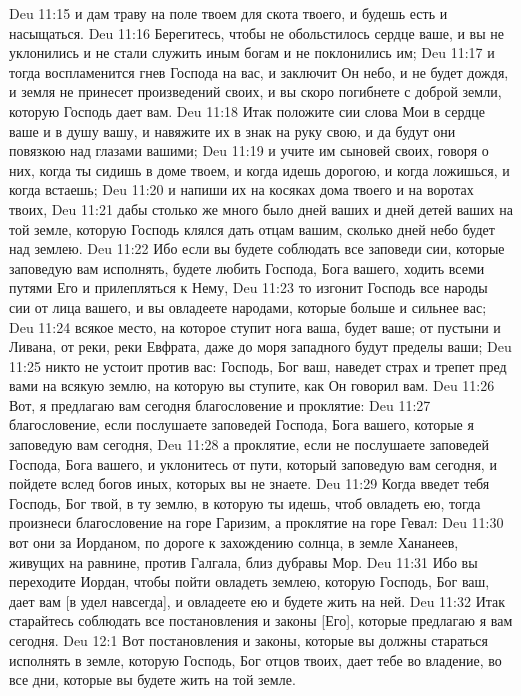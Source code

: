 \vs Deu 11:15 и дам траву на поле твоем для скота твоего, и будешь есть и насыщаться.
\vs Deu 11:16 Берегитесь, чтобы не обольстилось сердце ваше, и вы не уклонились и не стали служить иным богам и не поклонились им;
\vs Deu 11:17 и тогда воспламенится гнев Господа на вас, и заключит Он небо, и не будет дождя, и земля не принесет произведений своих, и вы скоро погибнете с доброй земли, которую Господь дает вам.
\vs Deu 11:18 Итак положите сии слова Мои в сердце ваше и в душу вашу, и навяжите их в знак на руку свою, и да будут они повязкою над глазами вашими;
\vs Deu 11:19 и учите им сыновей своих, говоря о них, когда ты сидишь в доме твоем, и когда идешь дорогою, и когда ложишься, и когда встаешь;
\vs Deu 11:20 и напиши их на косяках дома твоего и на воротах твоих,
\vs Deu 11:21 дабы столько же много было дней ваших и дней детей ваших на той земле, которую Господь клялся дать отцам вашим, сколько дней небо будет над землею.
\vs Deu 11:22 Ибо если вы будете соблюдать все заповеди сии, которые заповедую вам исполнять, будете любить Господа, Бога вашего, ходить всеми путями Его и прилепляться к Нему,
\vs Deu 11:23 то изгонит Господь все народы сии от лица вашего, и вы овладеете народами, которые больше и сильнее вас;
\vs Deu 11:24 всякое место, на которое ступит нога ваша, будет ваше; от пустыни и Ливана, от реки, реки Евфрата, даже до моря западного будут пределы ваши;
\vs Deu 11:25 никто не устоит против вас: Господь, Бог ваш, наведет страх и трепет пред вами на всякую землю, на которую вы ступите, как Он говорил вам.
\vs Deu 11:26 Вот, я предлагаю вам сегодня благословение и проклятие:
\vs Deu 11:27 благословение, если послушаете заповедей Господа, Бога вашего, которые я заповедую вам сегодня,
\vs Deu 11:28 а проклятие, если не послушаете заповедей Господа, Бога вашего, и уклонитесь от пути, который заповедую вам сегодня, и пойдете вслед богов иных, которых вы не знаете.
\vs Deu 11:29 Когда введет тебя Господь, Бог твой, в ту землю, в которую ты идешь, чтоб овладеть ею, тогда произнеси благословение на горе Гаризим, а проклятие на горе Гевал:
\vs Deu 11:30 вот они за Иорданом, по дороге к захождению солнца, в земле Хананеев, живущих на равнине, против Галгала, близ дубравы Мор.
\vs Deu 11:31 Ибо вы переходите Иордан, чтобы пойти овладеть землею, которую Господь, Бог ваш, дает вам [в удел навсегда], и овладеете ею и будете жить на ней.
\vs Deu 11:32 Итак старайтесь соблюдать все постановления и законы [Его], которые предлагаю я вам сегодня.
\vs Deu 12:1 Вот постановления и законы, которые вы должны стараться исполнять в земле, которую Господь, Бог отцов твоих, дает тебе во владение, во все дни, которые вы будете жить на той земле.
